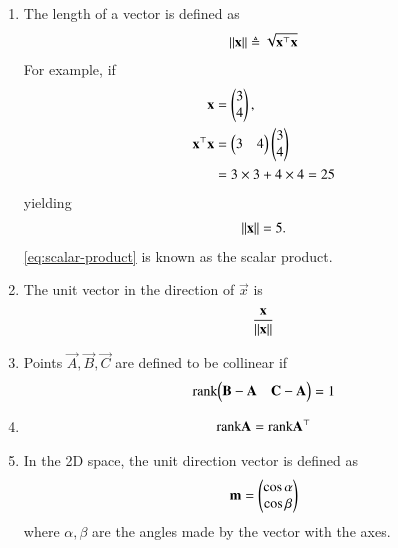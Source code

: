 \begin{enumerate}[label=\thesubsection.\arabic*.,ref=\thesubsection.\theenumi]
	\item The length of a vector  is  defined as
		\begin{align}
		\label{eq:side-length}
			 \left\lVert\mathbf{x}\right\rVert \triangleq \sqrt{\mathbf{x}^{\top}\mathbf{x}}
		\end{align}
		For example, if 
\begin{align}
\mathbf{x}
	&=\begin{pmatrix}3 \\ 4\end{pmatrix},
	\\
	\mathbf{x}^{\top}\mathbf{x} &= \begin{pmatrix}3 & 4\end{pmatrix}\begin{pmatrix}3 \\ 4\end{pmatrix}
	\label{eq:scalar-product}
	\\
	&=3 \times 3 + 4 \times 4 = 25
\end{align}
yielding
		\begin{align}
			 \left\lVert\mathbf{x}\right\rVert = 5.
		\end{align}
	\eqref{eq:scalar-product}
	is known as the scalar product.
	\item The unit vector in the direction of $\vec{x}$ is 
		\begin{align}
		\label{eq:unit-vec}
			 \frac{\mathbf{x}}{\left\lVert\mathbf{x}\right\rVert} 
		\end{align}
		\iffalse
\item   For a 2D space, 
	points $\vec{A}, \vec{B}, \vec{C}$ are defined to be collinear if 
		\fi
	\item 
	Points $\vec{A}, \vec{B}, \vec{C}$ are defined to be collinear if 
		\begin{align}
			\label{eq:line-rank-2}
			\text{rank}{\ensuremath{\begin{pmatrix}\mathbf{B}-\mathbf{A}& \mathbf{C}-\mathbf{A}\end{pmatrix}}} = 1
		\end{align}
	\item 
\begin{align}
			\label{eq:mat-rank-t}
	\text{rank}{\mathbf{A}}
	=
	\text{rank}{\mathbf{A}^\top}
\end{align}
\item In the 2D space, the unit direction vector is defined as
\begin{align}
		\label{eq:dir-vec-3d}
\mathbf{m}=\begin{pmatrix}\cos \alpha\\ \cos \beta \end{pmatrix}
\end{align}
where ${ \alpha,  \beta }$ are the angles made by the vector with the axes.
\end{enumerate}
